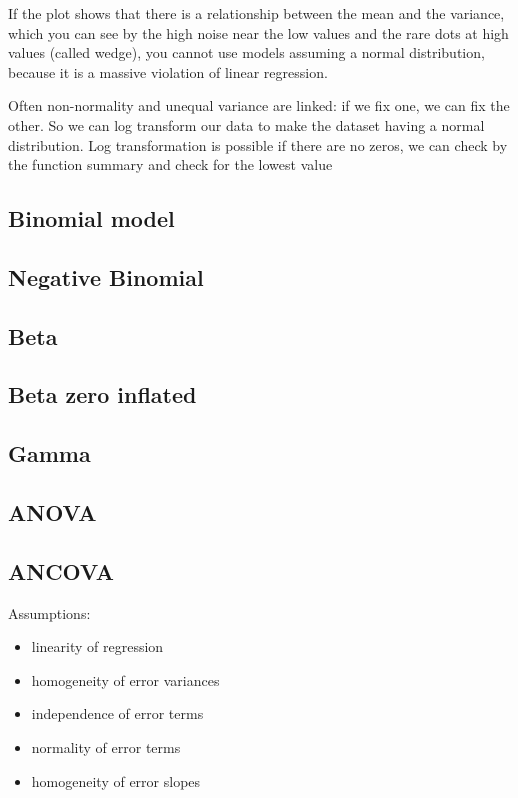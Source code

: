 \documentclass[]{article}
\providecommand{\tightlist}{%
  \setlength{\itemsep}{0pt}\setlength{\parskip}{0pt}}
\begin{document}
If the plot shows that there is a relationship between the mean and the
variance, which you can see by the high noise near the low values and
the rare dots at high values (called wedge), you cannot use models
assuming a normal distribution, because it is a massive violation of
linear regression.

Often non-normality and unequal variance are linked: if we fix one, we
can fix the other. So we can log transform our data to make the dataset
having a normal distribution. Log transformation is possible if there
are no zeros, we can check by the function summary and check for the
lowest value

\subsection{Binomial model}\label{binomial-model}

\subsection{Negative Binomial}\label{negative-binomial}

\subsection{Beta}\label{beta}

\subsection{Beta zero inflated}\label{beta-zero-inflated}

\subsection{Gamma}\label{gamma}

\subsection{ANOVA}\label{anova}

\subsection{ANCOVA}\label{ancova}

Assumptions:

\begin{itemize}
\tightlist
\item
  linearity of regression
\item
  homogeneity of error variances
\item
  independence of error terms
\item
  normality of error terms
\item
  homogeneity of error slopes
\end{itemize}
\end{document}
